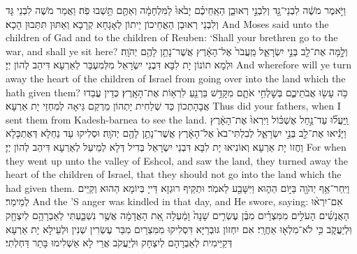 {וַיֹּ֣אמֶר מֹשֶׁ֔ה לִבְנֵי־גָ֖ד וְלִבְנֵ֣י רְאוּבֵ֑ן הַאַֽחֵיכֶ֗ם יָבֹ֙אוּ֙ לַמִּלְחָמָ֔ה וְאַתֶּ֖ם תֵּ֥שְׁבוּ פֹֽה׃
}
{וַאֲמַר מֹשֶׁה לִבְנֵי גָּד וְלִבְנֵי רְאוּבֵן הַאֲחֵיכוֹן יֵיתוֹן לְאָגָחָא קְרָבָא וְאַתּוּן תִּתְּבוּן הָכָא׃}
{And Moses said unto the children of Gad and to the children of Reuben: ‘Shall your brethren go to the war, and shall ye sit here?}{}
{וְלָ֣מָּה  אֶת־לֵ֖ב בְּנֵ֣י יִשְׂרָאֵ֑ל מֵֽעֲבֹר֙ אֶל־הָאָ֔רֶץ אֲשֶׁר־נָתַ֥ן לָהֶ֖ם יְהֹוָֽה׃
}
{וּלְמָא תוֹנוֹן יָת לִבָּא דִּבְנֵי יִשְׂרָאֵל מִלְּמִעְבַּר לְאַרְעָא דִּיהַב לְהוֹן יְיָ׃}
{And wherefore will ye turn away the heart of the children of Israel from going over into the land which the \lord\space hath given them?}{}
{כֹּ֥ה עָשׂ֖וּ אֲבֹתֵיכֶ֑ם בְּשׇׁלְחִ֥י אֹתָ֛ם מִקָּדֵ֥שׁ בַּרְנֵ֖עַ לִרְא֥וֹת אֶת־הָאָֽרֶץ׃
}
{כְּדֵין עֲבַדוּ אֲבָהָתְכוֹן כַּד שְׁלַחִית יָתְהוֹן מֵרְקַם גֵּיאָה לְמִחְזֵי יָת אַרְעָא׃}
{Thus did your fathers, when I sent them from Kadesh-barnea to see the land.}{}
{וַֽיַּעֲל֞וּ עַד־נַ֣חַל אֶשְׁכּ֗וֹל וַיִּרְאוּ֙ אֶת־הָאָ֔רֶץ וַיָּנִ֕יאוּ אֶת־לֵ֖ב בְּנֵ֣י יִשְׂרָאֵ֑ל לְבִלְתִּי־בֹא֙ אֶל־הָאָ֔רֶץ אֲשֶׁר־נָתַ֥ן לָהֶ֖ם יְהֹוָֽה׃}
{וּסְלִיקוּ עַד נַחְלָא דְּאֶתְכָּלָא וַחֲזוֹ יָת אַרְעָא וְאוֹנִיאוּ יָת לִבָּא דִּבְנֵי יִשְׂרָאֵל בְּדִיל דְּלָא לְמֵיעַל לְאַרְעָא דִּיהַב לְהוֹן יְיָ׃}
{For when they went up unto the valley of Eshcol, and saw the land, they turned away the heart of the children of Israel, that they should not go into the land which the \lord\space had given them.}{}
{וַיִּֽחַר־אַ֥ף יְהֹוָ֖ה בַּיּ֣וֹם הַה֑וּא וַיִּשָּׁבַ֖ע לֵאמֹֽר׃}
{וּתְקֵיף רוּגְזָא דַּייָ בְּיוֹמָא הַהוּא וְקַיֵּים לְמֵימַר׃}
{And the \lord’S anger was kindled in that day, and He swore, saying:}{}
{אִם־יִרְא֨וּ הָאֲנָשִׁ֜ים הָעֹלִ֣ים מִמִּצְרַ֗יִם מִבֶּ֨ן עֶשְׂרִ֤ים שָׁנָה֙ וָמַ֔עְלָה אֵ֚ת הָאֲדָמָ֔ה אֲשֶׁ֥ר נִשְׁבַּ֛עְתִּי לְאַבְרָהָ֥ם לְיִצְחָ֖ק וּֽלְיַעֲקֹ֑ב כִּ֥י לֹא־מִלְא֖וּ אַחֲרָֽי׃}
{אִם יִחְזוֹן גּוּבְרַיָּא דִּסְלִיקוּ מִמִּצְרַיִם מִבַּר עֶשְׂרִין שְׁנִין וּלְעֵילָא יָת אַרְעָא דְּקַיֵּימִית לְאַבְרָהָם לְיִצְחָק וּלְיַעֲקֹב אֲרֵי לָא אַשְׁלִימוּ בָּתַר דַּחְלְתִי׃}
